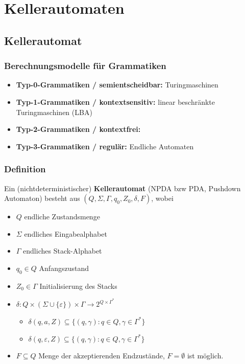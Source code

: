

\section{Kellerautomaten}
\subsection{Kellerautomat}

\begin{frame}
	\frametitle{Berechnungsmodelle für Grammatiken}
	
	\begin{itemize}
		\item \textbf{Typ-0-Grammatiken / semientscheidbar:} Turingmaschinen
		\item \textbf{Typ-1-Grammatiken / kontextsensitiv:} linear beschränkte Turingmaschinen (LBA)
		\item \textbf{Typ-2-Grammatiken / kontextfrei:}  \only<2>{Kellerautomaten!}
		\item \textbf{Typ-3-Grammatiken / regulär:} Endliche Automaten
	\end{itemize}
\end{frame}


\begin{frame}
\frametitle{Definition}
Ein (nichtdeterministischer) \textbf{Kellerautomat} (NPDA bzw PDA, Pushdown Automaton) besteht aus $(Q, \Sigma, \Gamma, q_0, Z_0,\delta, F)$, wobei
\begin{itemize}
\item $Q$ endliche Zustandsmenge
\item $\Sigma$ endliches Eingabealphabet
\item $\Gamma$ endliches Stack-Alphabet
\item $q_0 \in Q$ Anfangszustand
\item $Z_0 \in \Gamma$ Initialisierung des Stacks
\item $\delta : Q \times ( \Sigma \cup \{\varepsilon\}) \times \Gamma \rightarrow 2^{Q \times \Gamma^*}$
\begin{itemize}
\item $\delta(q, a, Z) \subseteq \{(q,\gamma) : q \in Q, \gamma \in \Gamma^*\}$
\item $\delta(q, \varepsilon, Z) \subseteq \{(q,\gamma) : q \in Q, \gamma \in \Gamma^*\}$
\end{itemize}
\item $F \subseteq Q$ Menge der akzeptierenden Endzustände, $F=\emptyset$ ist möglich.


\vspace{-4cm}
\end{itemize}
\end{frame}

